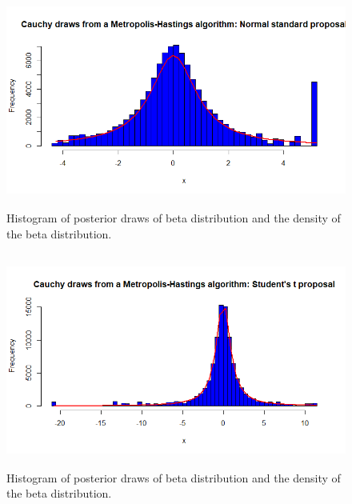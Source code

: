 \begin{enumerate}[leftmargin=*]
\begin{figure}[!h]
	\includegraphics[width=340pt, height=200pt]{Chapters/chapter5/figures/MHnormal.png}
	\caption[List of figure caption goes here]{Histogram of posterior draws of beta distribution and the density of the beta distribution.}\label{fig52}
\end{figure} 

\begin{figure}[!h]
	\includegraphics[width=340pt, height=200pt]{Chapters/chapter5/figures/MHt.png}
	\caption[List of figure caption goes here]{Histogram of posterior draws of beta distribution and the density of the beta distribution.}\label{fig53}
\end{figure} 

  

\end{enumerate}